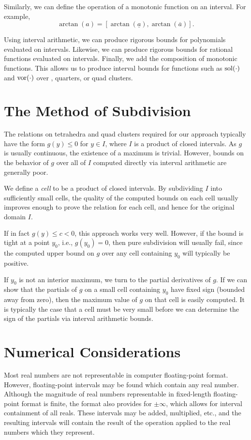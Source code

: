 Similarly, we can define the operation of a monotonic function on
an interval.  For example,
\[
\arctan(a) = [\arctan(\underline{a}), \arctan(\overline{a})].
\]

Using interval arithmetic, we can produce rigorous bounds for polynomials
evaluated on intervals.  Likewise, we can produce rigorous bounds for
rational functions evaluated on intervals.  Finally, we add the
composition of monotonic functions.  This allows us to produce interval
bounds for functions such as $\operatorname{sol}(\cdot)$ and $\operatorname{vor}(\cdot)$ over \qrtets,
quarters, or quad clusters.


\section{The Method of Subdivision}
The relations on tetrahedra and quad clusters required for
our approach typically have
the form
$g(y)\le 0$ for $y \in I$, where $I$ is a product of closed
intervals.  As $g$ is usually continuous, the existence of a
maximum is trivial.  However, bounds on the behavior of $g$
over all of $I$ computed directly via interval arithmetic
are generally poor.

We define a {\em cell} to be a product of closed intervals.
By subdividing $I$ into
sufficiently small cells, the quality of the computed bounds on
each cell usually
improves enough to prove the relation for each cell, and hence
for the original domain $I$.

If in fact $g(y) \le c < 0$, this approach works very well.  However,
if the bound is tight at a point $y_0$, i.e., $g(y_0)=0$, then pure
subdivision will usually fail, since the computed upper bound on $g$ over
any cell containing $y_0$ will typically be positive.

If $y_0$ is not an interior maximum,
we turn to the partial derivatives of $g$.  If
we can show that the partials of $g$ on a small cell containing
$y_0$ have fixed sign (bounded away from zero), then the
maximum value of $g$ on that cell is easily computed.
It is typically the case that a cell
must be very small before we can determine the sign of the
partials via interval arithmetic bounds.


\section{Numerical Considerations}
Most real numbers are not representable in computer floating-point
format.  However, floating-point intervals may be found which contain
any real number.  Although the magnitude of real numbers representable in
fixed-length floating-point format is finite, the format also provides
for $\pm \infty$, which allows for interval containment of all reals.
These intervals may be
added, multiplied, etc., and the resulting intervals will contain
the result of the operation applied to the real numbers which they
represent.

